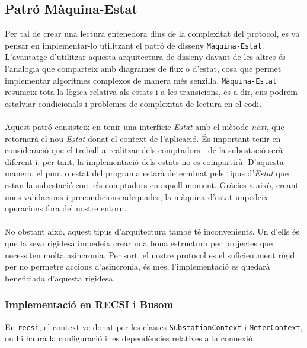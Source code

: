 \subsection{Patró Màquina-Estat}
Per tal de crear una lectura entenedora dins de la complexitat del protocol, es va pensar en implementar-lo utilitzant el patró de disseny \texttt{Màquina-Estat}. L'avantatge d'utilitzar aquesta arquitectura de disseny davant de les altres és l'analogia que comparteix amb diagrames de flux o d'estat, cosa que permet implementar algoritmes complexos de manera més senzilla. \texttt{Màquina-Estat} resumeix tota la lògica relativa als estats i a les transicions, és a dir, ens podrem estalviar condicionals i problemes de complexitat de lectura en el codi.
\\
\\
Aquest patró consisteix en tenir una interfície \textit{Estat} amb el mètode \textit{next}, que retornarà el nou \textit{Estat} donat el context de l'aplicació. És important tenir en consideració que el treball a realitzar dels comptadors i de la subestació serà diferent i, per tant, la implementació dels estats no es compartirà. D'aquesta manera, el punt o estat del programa estarà determinat pels tipus d'\textit{Estat} que estan la subestació com els comptadors en aquell moment. Gràcies a això, creant unes validacions i precondicions adequades, la màquina d’estat impedeix operacions fora del nostre entorn.
\\
\\
No obstant això, aquest tipus d'arquitectura també té inconvenients. Un d'ells és que la seva rigidesa impedeix crear una bona estructura per projectes que necessiten molta asincronia. Per sort, el nostre protocol es el suficientment rígid per no permetre accions d'asincronia, és més, l'implementació es quedarà beneficiada d'aquesta rigidesa.
\subsubsection{Implementació en RECSI i Busom}
En \texttt{recsi}, el context ve donat per les classes \texttt{SubstationContext} i \texttt{MeterContext}, on hi haurà la configuració i les dependències relatives a la connexió.
\\
\\

